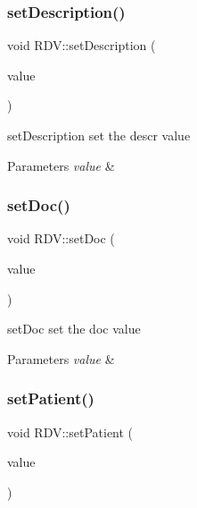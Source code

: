 \subsubsection{\texorpdfstring{setDescription()}{setDescription()}}
{\footnotesize\ttfamily void R\+D\+V\+::set\+Description (\begin{DoxyParamCaption}\item[{const Q\+String \&}]{value }\end{DoxyParamCaption})}



set\+Description set the descr value 


\begin{DoxyParams}{Parameters}
{\em value} & \\
\hline
\end{DoxyParams}
\mbox{\label{class_r_d_v_a3adc9de12843f5901de9dd1e08954de4}} 
\subsubsection{\texorpdfstring{setDoc()}{setDoc()}}
{\footnotesize\ttfamily void R\+D\+V\+::set\+Doc (\begin{DoxyParamCaption}\item[{const Q\+String \&}]{value }\end{DoxyParamCaption})}



set\+Doc set the doc value 


\begin{DoxyParams}{Parameters}
{\em value} & \\
\hline
\end{DoxyParams}
\mbox{\label{class_r_d_v_a330240101b7580edad087123afbf96a1}} 
\subsubsection{\texorpdfstring{setPatient()}{setPatient()}}
{\footnotesize\ttfamily void R\+D\+V\+::set\+Patient (\begin{DoxyParamCaption}\item[{Q\+String}]{value }\end{DoxyParamCaption})}



